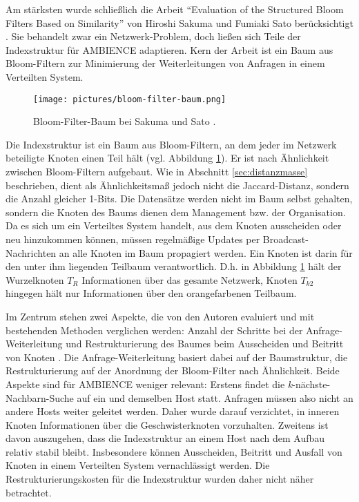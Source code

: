 Am stärksten wurde schließlich die Arbeit "`Evaluation of the Structured Bloom Filters Based on Similarity"' von Hiroshi Sakuma und Fumiaki Sato berücksichtigt \cite{Sakuma2011}. Sie behandelt zwar ein Netzwerk-Problem, doch ließen sich Teile der Indexstruktur für AMBIENCE adaptieren. Kern der Arbeit ist ein Baum aus Bloom-Filtern zur Minimierung der Weiterleitungen von Anfragen in einem Verteilten System. 
\begin{figure}[hpbt]
  \centering
  \texttt{[image: pictures/bloom-filter-baum.png]}\\
  \caption[Bloom-Filter-Baum bei Sakuma und Sato]{Bloom-Filter-Baum bei Sakuma und Sato \cite{Sakuma2011}.}\label{fig:pic5}
\end{figure}
Die Indexstruktur ist ein Baum aus Bloom-Filtern, an dem jeder im Netzwerk beteiligte Knoten einen Teil hält (vgl. Abbildung \ref{fig:pic5}). Er ist nach Ähnlichkeit zwischen Bloom-Filtern aufgebaut. Wie in Abschnitt \ref{sec:distanzmasse} beschrieben, dient als Ähnlichkeitsmaß jedoch nicht die Jaccard-Distanz, sondern die Anzahl gleicher 1-Bits. Die Datensätze werden nicht im Baum selbst gehalten, sondern die Knoten des Baums dienen dem Management bzw. der Organisation. Da es sich um ein Verteiltes System handelt, aus dem Knoten ausscheiden oder neu hinzukommen können, müssen regelmäßige Updates per Broadcast-Nachrichten an alle Knoten im Baum propagiert werden. Ein Knoten ist darin für den unter ihm liegenden Teilbaum verantwortlich. D.h. in Abbildung \ref{fig:pic5} hält der Wurzelknoten $T_R$ Informationen über das gesamte Netzwerk, Knoten $T_{k2}$ hingegen hält nur Informationen über den orangefarbenen Teilbaum. 

Im Zentrum stehen zwei Aspekte, die von den Autoren evaluiert und mit bestehenden Methoden verglichen werden: Anzahl der Schritte bei der Anfrage-Weiterleitung und Restrukturierung des Baumes beim Ausscheiden und Beitritt von Knoten \cite{Sakuma2011}. Die Anfrage-Weiterleitung basiert dabei auf der Baumstruktur, die Restrukturierung auf der Anordnung der Bloom-Filter nach Ähnlichkeit. Beide Aspekte sind für AMBIENCE weniger relevant: Erstens findet die \textit{k}-nächste-Nachbarn-Suche auf ein und demselben Host statt. Anfragen müssen also nicht an andere Hosts weiter geleitet werden. Daher wurde darauf verzichtet, in inneren Knoten Informationen über die Geschwisterknoten vorzuhalten. Zweitens ist davon auszugehen, dass die Indexstruktur an einem Host nach dem Aufbau relativ stabil bleibt. Insbesondere können Ausscheiden, Beitritt und Ausfall von Knoten in einem Verteilten System vernachlässigt werden. Die Restrukturierungskosten für die Indexstruktur wurden daher nicht näher betrachtet.  

